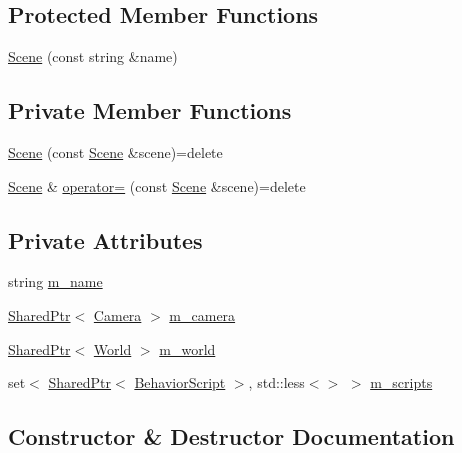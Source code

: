 \subsection*{Protected Member Functions}
\begin{DoxyCompactItemize}
\item 
\hyperlink{classmage_1_1_scene_aab61b38547fc53aa9c5b3b559f4d2e26}{Scene} (const string \&name)
\end{DoxyCompactItemize}
\subsection*{Private Member Functions}
\begin{DoxyCompactItemize}
\item 
\hyperlink{classmage_1_1_scene_a88d83ccb2e10549d5370f850b2b4c228}{Scene} (const \hyperlink{classmage_1_1_scene}{Scene} \&scene)=delete
\item 
\hyperlink{classmage_1_1_scene}{Scene} \& \hyperlink{classmage_1_1_scene_a2c25c0fedc0230771d8c00a8288a69ce}{operator=} (const \hyperlink{classmage_1_1_scene}{Scene} \&scene)=delete
\end{DoxyCompactItemize}
\subsection*{Private Attributes}
\begin{DoxyCompactItemize}
\item 
string \hyperlink{classmage_1_1_scene_a6cc8cb08b1853c4e3063b33a94e8fb47}{m\+\_\+name}
\item 
\hyperlink{namespacemage_a1e01ae66713838a7a67d30e44c67703e}{Shared\+Ptr}$<$ \hyperlink{classmage_1_1_camera}{Camera} $>$ \hyperlink{classmage_1_1_scene_a961c280659f9934441d8e835508e933d}{m\+\_\+camera}
\item 
\hyperlink{namespacemage_a1e01ae66713838a7a67d30e44c67703e}{Shared\+Ptr}$<$ \hyperlink{classmage_1_1_world}{World} $>$ \hyperlink{classmage_1_1_scene_ab03b79c8ae30602fea1fabb84927a829}{m\+\_\+world}
\item 
set$<$ \hyperlink{namespacemage_a1e01ae66713838a7a67d30e44c67703e}{Shared\+Ptr}$<$ \hyperlink{classmage_1_1_behavior_script}{Behavior\+Script} $>$, std\+::less$<$$>$ $>$ \hyperlink{classmage_1_1_scene_a74ad0b8c6b085bd519de33da51ebb8dd}{m\+\_\+scripts}
\end{DoxyCompactItemize}


\subsection{Constructor \& Destructor Documentation}
\hypertarget{classmage_1_1_scene_a6b97d0181285a69bd0a9789f534abc43}{}\label{classmage_1_1_scene_a6b97d0181285a69bd0a9789f534abc43} 
